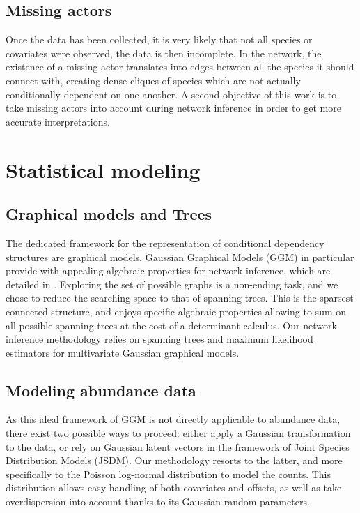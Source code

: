 \subsection*{Missing actors}
Once the data has been collected, it is very likely that not all species or covariates were observed, the data is then incomplete. In the network, the existence of a missing actor translates into  edges between all the species it should connect with, creating dense cliques of species which are not actually conditionally dependent on one another. A second objective of this work is to take missing actors into account during network inference in order to get more accurate interpretations.

\section*{Statistical modeling}
 \subsection*{Graphical models and Trees}
The dedicated framework for the representation of conditional dependency structures are graphical models. Gaussian Graphical Models (GGM) in particular provide with appealing algebraic properties for network inference, which are detailed in \citet{Lau96}. Exploring the set of possible graphs is a non-ending task, and we chose to reduce the searching space to that of spanning trees. This is the sparsest connected structure, and enjoys specific algebraic properties allowing to sum on all possible spanning trees at the cost of a determinant calculus. Our network inference methodology relies on spanning trees and \citet{Lau96} maximum likelihood estimators for multivariate Gaussian graphical models.

 \subsection*{Modeling abundance data}
 As this ideal framework of GGM is not directly applicable to abundance data, there exist two possible ways to proceed: either apply a Gaussian transformation to the data, or rely on Gaussian latent vectors in the framework of Joint Species Distribution Models (JSDM). Our methodology resorts to the latter, and more specifically to the Poisson log-normal distribution to model the counts. This distribution allows easy handling of both covariates and offsets, as well as take overdispersion into account thanks to its Gaussian random parameters. 
 
